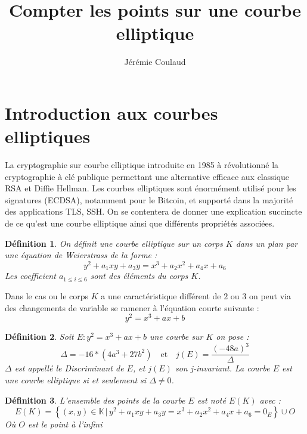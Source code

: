\documentclass{article}
\title{Compter les points sur une courbe elliptique}
\author{Jérémie Coulaud}
\begin{document}
\newtheorem{prop}{Proposition}
\newtheorem{defi}{Définition}
\newtheorem{thm}{Théorème}
\maketitle
\newpage
\tableofcontents
\newpage

\section{Introduction aux courbes elliptiques}
La cryptographie sur courbe elliptique introduite en 1985 à révolutionné la cryptographie à clé publique permettant une alternative efficace aux classique RSA et Diffie Hellman. Les courbes elliptiques sont énormément utilisé pour les signatures (ECDSA), notamment pour le Bitcoin, et supporté dans la majorité des applications TLS, SSH. On se contentera de donner une explication succincte de ce qu'est une courbe elliptique ainsi que différents propriétés associées.

\begin{defi}
On définit une courbe elliptique sur un corps $K$ dans un plan par une équation de Weierstrass de la forme : 
\begin{equation*}
y^2 + a_1xy + a_3y  = x^3 + a_2x^2 + a_4x + a_6
\end{equation*}
Les coefficient $a_{1 \leq i \leq 6}$ sont des éléments du corps $K$.
\end{defi}

Dans le cas ou le corps $K$ a une caractéristique différent de $2$ ou $3$ on peut via des changements de variable se ramener à l'équation courte suivante : 
\begin{equation*}
y^2 = x^3 + ax +b
\end{equation*}

\begin{defi}
Soit $E : y^2 = x^3 + ax +b$ une courbe sur $K$ on pose : 
\begin{equation*}
\Delta = -16*(4a^3 + 27b^2) \quad \text{et} \quad j(E) = \frac{(-48a)^3}{\Delta}
\end{equation*}
$\Delta$ est appellé le Discriminant de $E$, et $j(E)$ son j-invariant. La courbe $E$ est une courbe elliptique si et seulement si $\Delta \ne 0$.
\end{defi}

\begin{defi}
L'ensemble des points de la courbe $E$ est noté $E(K)$ avec :
\begin{equation*}
E(K) = \left\{ (x,y) \in \mathbb{K} \, | \, y^2 + a_1xy + a_3y  = x^3 + a_2x^2 + a_4x + a_6 = 0_E \right\} \cup {O}
\end{equation*}
Où $O$ est le point à l'infini
\end{defi}
\end{document}
